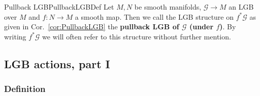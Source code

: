 \documentclass[reqno,a4paper,oneside]{amsart}
\theoremstyle{plain}
\theoremstyle{remark}
\theoremstyle{definition}
\def\bas#1\eas{\begin{align*}#1\end{align*}}
\begin{document}

\begin{definitions}{Pullback LGB}{PullbackLGBDef}
Let $M, N$ be smooth manifolds, $\mathcal{G} \to M$ an LGB over $M$ and $f\colon N \to M$ a smooth map. Then we call the LGB structure on $f^*\mathcal{G}$ as given in Cor.\ \ref{cor:PullbackLGB} the \textbf{pullback LGB of $\mathcal{G}$ (under $f$)}. By writing $f^*\mathcal{G}$ we will often refer to this structure without further mention.
\end{definitions}

\subsection{LGB actions, part I}

\subsubsection{Definition}
\end{document}
